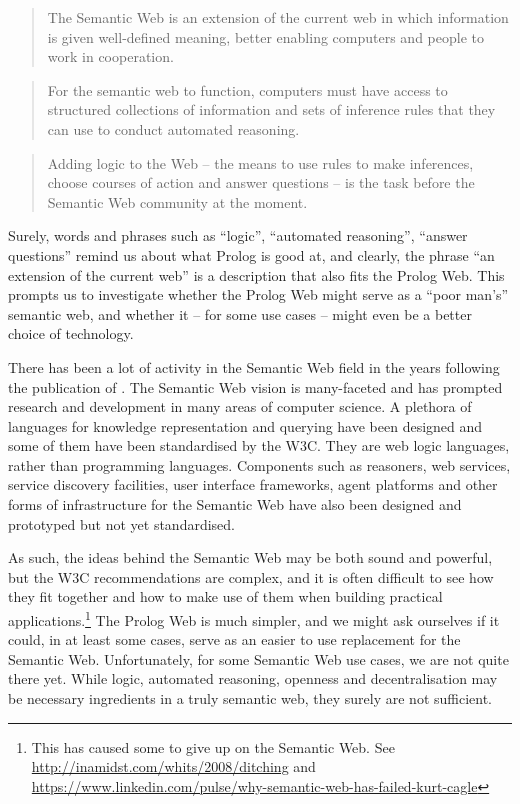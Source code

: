 \documentclass{tlp}
\begin{document}
\begin{quote}
The Semantic Web is an extension of the current web in which information is given well-defined meaning, better enabling computers and people to work in cooperation.
\end{quote}

\begin{quote}
For the semantic web to function, computers must have access to structured collections of information and sets of inference rules that they can use to conduct automated reasoning.
\end{quote}

\begin{quote}
Adding logic to the Web -- the means to use rules to make inferences, choose courses of action and answer questions -- is the task before the Semantic Web community at the moment.
\end{quote}

\noindent Surely, words and phrases such as ``logic'', ``automated reasoning'', ``answer questions'' remind us about what Prolog is good at, and clearly, the phrase ``an extension of the current web'' is a description that also fits the Prolog Web. This prompts us to investigate whether the Prolog Web might serve as a ``poor man's'' semantic web, and whether it -- for some use cases -- might even be a better choice of technology.

There has been a lot of activity in the Semantic Web field in the years following the publication of \cite{bernerslee2001semantic}. The Semantic Web vision is many-faceted and has prompted research and development in many areas of computer science. A plethora of languages for knowledge representation and querying have been designed and some of them have been standardised by the W3C. They are web logic languages, rather than programming languages. Components such as reasoners, web services, service discovery facilities, user interface frameworks, agent platforms and other forms of infrastructure for the Semantic Web have also been designed and prototyped but not yet standardised. 

As such, the ideas behind the Semantic Web may be both sound and powerful, but the W3C recommendations are complex, and it is often difficult to see how they fit together and how to make use of them when building practical applications.\footnote{This has caused some to give up on the Semantic Web. See \url{http://inamidst.com/whits/2008/ditching} and \url{https://www.linkedin.com/pulse/why-semantic-web-has-failed-kurt-cagle}} The Prolog Web is much simpler, and we might ask ourselves if it could, in at least some cases, serve as an easier to use replacement for the Semantic Web. Unfortunately, for some Semantic Web use cases, we are not quite there yet. While logic, automated reasoning, openness and decentralisation may be necessary ingredients in a truly semantic web, they surely are not sufficient. 
\end{document}
